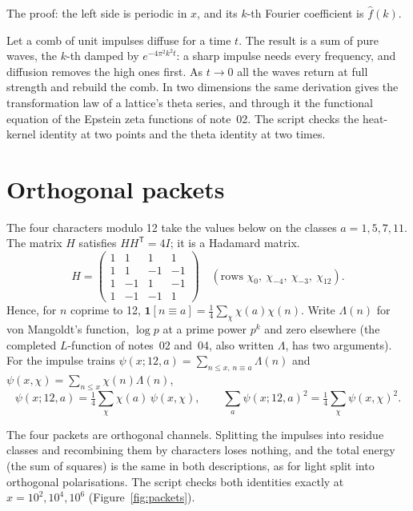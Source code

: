 \documentclass[11pt]{article}
\begin{document}
\noindent
The proof: the left side is periodic in $x$, and its $k$-th Fourier coefficient is $\hat f(k)$.

\physical
Let a comb of unit impulses diffuse for a time $t$.
The result is a sum of pure waves, the $k$-th damped by $e^{-4\pi^2k^2t}$: a sharp impulse needs every frequency, and diffusion removes the high ones first.
As $t\to0$ all the waves return at full strength and rebuild the comb.
In two dimensions the same derivation gives the transformation law of a lattice's theta series, and through it the functional equation of the Epstein zeta functions of note~02.
The script  checks the heat-kernel identity at two points and the theta identity at two times.

\section{Orthogonal packets}

\begin{derivation}\label{d:prism}
The four characters modulo 12 take the values below on the classes $a = 1,5,7,11$.
The matrix $H$ satisfies $HH^{\mathsf T} = 4I$; it is a Hadamard matrix.
\[
  H = \begin{pmatrix} 1&1&1&1\\ 1&1&-1&-1\\ 1&-1&1&-1\\ 1&-1&-1&1\end{pmatrix}
  \quad(\text{rows } \chi_0,\ \chi_{-4},\ \chi_{-3},\ \chi_{12}).
\]
Hence, for $n$ coprime to 12, $\mathbf 1[n\equiv a] = \tfrac14\sum_\chi\chi(a)\chi(n)$.
Write $\Lambda(n)$ for von Mangoldt's function, $\log p$ at a prime power $p^k$ and zero elsewhere (the completed $L$-function of notes~02 and~04, also written $\Lambda$, has two arguments).
For the impulse trains $\psi(x;12,a) = \sum_{n\le x,\,n\equiv a}\Lambda(n)$ and $\psi(x,\chi) = \sum_{n\le x}\chi(n)\Lambda(n)$,
\[
  \psi(x;12,a) = \tfrac14\sum_\chi\chi(a)\,\psi(x,\chi),\qquad \sum_a\psi(x;12,a)^2 = \tfrac14\sum_\chi\psi(x,\chi)^2.
\]
\end{derivation}

\physical
The four packets are orthogonal channels.
Splitting the impulses into residue classes and recombining them by characters loses nothing, and the total energy (the sum of squares) is the same in both descriptions, as for light split into orthogonal polarisations.
The script checks both identities exactly at $x = 10^2, 10^4, 10^6$ (Figure~\ref{fig:packets}).
\end{document}
